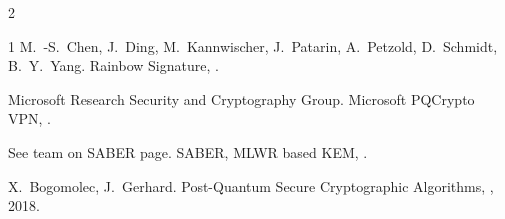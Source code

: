 \documentclass[a4paper,11pt]{article}
\begin{document}
\begin{otherlanguage}{english}
\begin{multicols}{2}
\begin{thebibliography}{1}
M.~-S.~Chen, J.~Ding, M.~Kannwischer, J.~Patarin, A.~Petzold, D.~Schmidt, B.~Y.~Yang.
\newblock Rainbow Signature,
.

Microsoft Research Security and Cryptography Group.
\newblock Microsoft PQCrypto VPN,
.

See team on SABER page.
\newblock SABER, MLWR based KEM,
.

X.~Bogomolec, J.~Gerhard.
\newblock Post-Quantum Secure Cryptographic Algorithms,
, 2018.
  
\end{thebibliography}


\end{multicols}



\end{otherlanguage}
\end{document}
